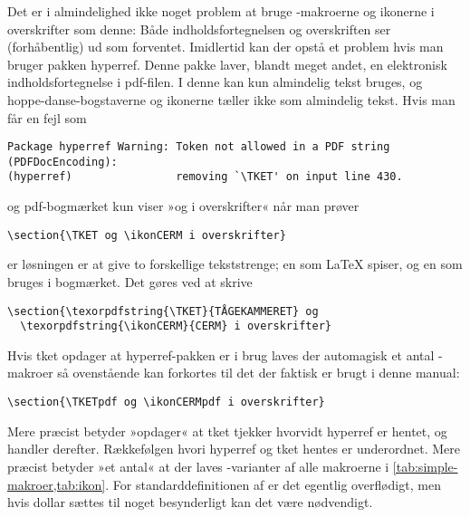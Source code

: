 \documentclass[a4paper,article,oneside,danish]{memoir}
\newcommand{\pakkenavn}[1]{\textsf{#1}}
\newcommand{\ptket}{\pakkenavn{tket}\xspace}
\newcommand*{\optionname}[1]{\textcolor{option}{#1}}
\begin{document}
Det er i almindelighed ikke noget problem at bruge -makroerne
og ikonerne i overskrifter som denne: Både indholdsfortegnelsen og
overskriften ser (forhåbentlig) ud som forventet. Imidlertid kan der
opstå et problem hvis man bruger pakken \pakkenavn{hyperref}. Denne
pakke laver, blandt meget andet, en elektronisk indholdsfortegnelse i
pdf-filen. I denne kan kun almindelig tekst bruges, og
hoppe-danse-bogstaverne og ikonerne tæller ikke som almindelig
tekst. Hvis man får en fejl som
\begin{verbatim}
Package hyperref Warning: Token not allowed in a PDF string (PDFDocEncoding):
(hyperref)                removing `\TKET' on input line 430.
\end{verbatim}
og pdf-bogmærket kun viser »og i overskrifter« når man prøver
\begin{verbatim}
\section{\TKET og \ikonCERM i overskrifter}
\end{verbatim}
er løsningen er at give to
forskellige tekststrenge; en som \LaTeX{} spiser, og en som bruges i
bogmærket. Det gøres ved at skrive
\begin{verbatim}
\section{\texorpdfstring{\TKET}{TÅGEKAMMERET} og
  \texorpdfstring{\ikonCERM}{CERM} i overskrifter}
\end{verbatim}

Hvis \ptket opdager at \pakkenavn{hyperref}-pakken er i brug laves der
automagisk et antal -makroer så ovenstående kan forkortes
til det der faktisk er brugt i denne manual:
\begin{verbatim}
\section{\TKETpdf og \ikonCERMpdf i overskrifter}
\end{verbatim}
Mere præcist betyder »opdager« at \ptket tjekker 
hvorvidt \pakkenavn{hyperref} er hentet, og handler
derefter. Rækkefølgen hvori \pakkenavn{hyperref} og \ptket hentes er
underordnet. Mere præcist betyder »et antal« at der laves
-varianter af alle makroerne i \vref{tab:simple-makroer,tab:ikon}.
For standarddefinitionen af  er det
egentlig overflødigt, men hvis \optionname{dollar} sættes til noget
besynderligt kan det være nødvendigt.
\end{document}
